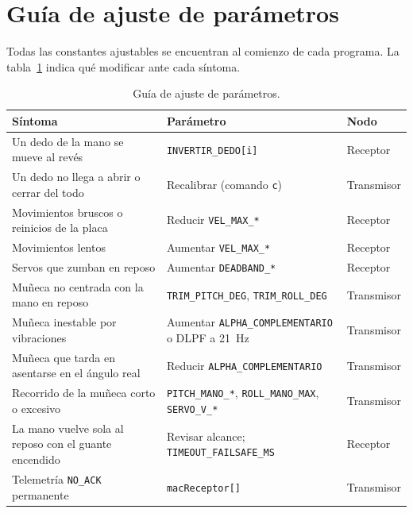 \section{Guía de ajuste de parámetros}
\label{ap:ajuste}

Todas las constantes ajustables se encuentran al comienzo de cada programa. La tabla~\ref{tab:ajuste} indica qué modificar ante cada síntoma.

\begin{table}[H]
\centering
\begin{tabularx}{\textwidth}{X l l}
\toprule
\textbf{Síntoma} & \textbf{Parámetro} & \textbf{Nodo} \\
\midrule
Un dedo de la mano se mueve al revés & \texttt{INVERTIR\_DEDO[i]} & Receptor \\
Un dedo no llega a abrir o cerrar del todo & Recalibrar (comando \texttt{c}) & Transmisor \\
Movimientos bruscos o reinicios de la placa & Reducir \texttt{VEL\_MAX\_*} & Receptor \\
Movimientos lentos & Aumentar \texttt{VEL\_MAX\_*} & Receptor \\
Servos que zumban en reposo & Aumentar \texttt{DEADBAND\_*} & Receptor \\
Muñeca no centrada con la mano en reposo & \texttt{TRIM\_PITCH\_DEG}, \texttt{TRIM\_ROLL\_DEG} & Transmisor \\
Muñeca inestable por vibraciones & Aumentar \texttt{ALPHA\_COMPLEMENTARIO} o DLPF a \SI{21}{\hertz} & Transmisor \\
Muñeca que tarda en asentarse en el ángulo real & Reducir \texttt{ALPHA\_COMPLEMENTARIO} & Transmisor \\
Recorrido de la muñeca corto o excesivo & \texttt{PITCH\_MANO\_*}, \texttt{ROLL\_MANO\_MAX}, \texttt{SERVO\_V\_*} & Transmisor \\
La mano vuelve sola al reposo con el guante encendido & Revisar alcance; \texttt{TIMEOUT\_FAILSAFE\_MS} & Receptor \\
Telemetría \texttt{NO\_ACK} permanente & \texttt{macReceptor[]} & Transmisor \\
\bottomrule
\end{tabularx}
\caption{Guía de ajuste de parámetros.}
\label{tab:ajuste}
\end{table}
